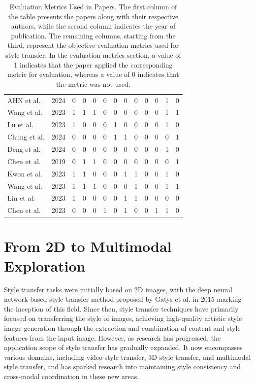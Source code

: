 \documentclass[preprint,12pt]{elsarticle}
\begin{document}
\begin{table}[t]
{\begin{tabular}{lcccccccccccc}
                AHN et al.\citep{63ahn2024dreamstyler} & 2024 & 0 & 0 & 0 & 0 & 0 & 0 & 0 & 0 & 0 & 1 & 0 \\
                Wang et al.\citep{64wang2023stylediffusion} & 2023 & 1 & 1 & 1 & 0 & 0 & 0 & 0 & 0 & 0 & 1 & 1 \\
                Lu et al.\citep{65lu2023specialist} & 2023 & 1 & 0 & 0 & 0 & 1 & 0 & 0 & 0 & 0 & 1 & 0 \\
                Chung et al.\citep{66chung2024style} & 2024 & 0 & 0 & 0 & 0 & 1 & 1 & 0 & 0 & 0 & 0 & 1 \\
                Deng et al.\citep{67deng2024z} & 2024 & 0 & 0 & 0 & 0 & 0 & 0 & 0 & 0 & 0 & 1 & 0 \\
                Chen et al.\citep{70chen2019drop} & 2019 & 0 & 1 & 1 & 0 & 0 & 0 & 0 & 0 & 0 & 0 & 1 \\
                Kwon et al.\citep{71kwon2024aesfa} & 2023 & 1 & 1 & 0 & 0 & 0 & 1 & 1 & 0 & 0 & 1 & 0 \\
                Wang et al.\citep{72wang2023microast} & 2023 & 1 & 1 & 1 & 0 & 0 & 0 & 1 & 0 & 0 & 1 & 1 \\
                Lin et al.\citep{78lin2023adacm} & 2023 & 1 & 0 & 0 & 0 & 0 & 1 & 1 & 0 & 0 & 0 & 0 \\
                Chen et al.\citep{80cheng2023user} & 2023 & 0 & 0 & 0 & 1 & 0 & 1 & 0 & 0 & 1 & 1 & 0 \\
                \bottomrule
            \end{tabular}
    }
    \caption{Evaluation Metrics Used in Papers. The first column of the table presents the papers along with their respective authors, while the second column indicates the year of publication. The remaining columns, starting from the third, represent the objective evaluation metrics used for style transfer. In the evaluation metrics section, a value of 1 indicates that the paper applied the corresponding metric for evaluation, whereas a value of 0 indicates that the metric was not used.}\label{table1_Evaluation}
\end{table}

\section{From 2D to Multimodal Exploration}

Style transfer tasks were initially based on 2D images, with the deep neural network-based style transfer method proposed by Gatys et al. in 2015 marking the inception of this field. Since then, style transfer techniques have primarily focused on transferring the style of images, achieving high-quality artistic style image generation through the extraction and combination of content and style features from the input image. However, as research has progressed, the application scope of style transfer has gradually expanded. It now encompasses various domains, including video style transfer, 3D style transfer, and multimodal style transfer, and has sparked research into maintaining style consistency and cross-modal coordination in these new areas.
\end{document}
